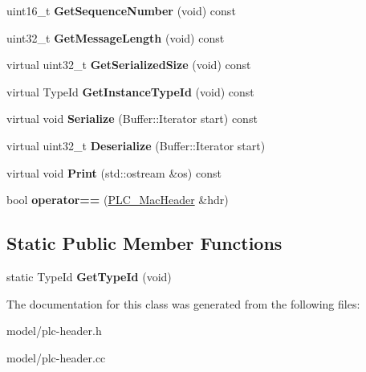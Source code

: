 \begin{DoxyCompactItemize}
\item 
\hypertarget{classns3_1_1PLC__MacHeader_af3e3e43fa22ed326bd86bb7b474b1992}{uint16\-\_\-t {\bfseries \-Get\-Sequence\-Number} (void) const }\label{classns3_1_1PLC__MacHeader_af3e3e43fa22ed326bd86bb7b474b1992}

\item 
\hypertarget{classns3_1_1PLC__MacHeader_a77818e10c83a5e070bdde25678102d3d}{uint32\-\_\-t {\bfseries \-Get\-Message\-Length} (void) const }\label{classns3_1_1PLC__MacHeader_a77818e10c83a5e070bdde25678102d3d}

\item 
\hypertarget{classns3_1_1PLC__MacHeader_a566ec93ae1dc22e40f44835d3370fc38}{virtual uint32\-\_\-t {\bfseries \-Get\-Serialized\-Size} (void) const }\label{classns3_1_1PLC__MacHeader_a566ec93ae1dc22e40f44835d3370fc38}

\item 
\hypertarget{classns3_1_1PLC__MacHeader_a25a65cd915ab002024f5053fb17a799b}{virtual \-Type\-Id {\bfseries \-Get\-Instance\-Type\-Id} (void) const }\label{classns3_1_1PLC__MacHeader_a25a65cd915ab002024f5053fb17a799b}

\item 
\hypertarget{classns3_1_1PLC__MacHeader_a913f9c4ab8055a36ba2027d514eb2b78}{virtual void {\bfseries \-Serialize} (\-Buffer\-::\-Iterator start) const }\label{classns3_1_1PLC__MacHeader_a913f9c4ab8055a36ba2027d514eb2b78}

\item 
\hypertarget{classns3_1_1PLC__MacHeader_a938c0de95ea150b68b69bdfe09e5605c}{virtual uint32\-\_\-t {\bfseries \-Deserialize} (\-Buffer\-::\-Iterator start)}\label{classns3_1_1PLC__MacHeader_a938c0de95ea150b68b69bdfe09e5605c}

\item 
\hypertarget{classns3_1_1PLC__MacHeader_a57133fa08027075f8e76aa81363f9eed}{virtual void {\bfseries \-Print} (std\-::ostream \&os) const }\label{classns3_1_1PLC__MacHeader_a57133fa08027075f8e76aa81363f9eed}

\item 
\hypertarget{classns3_1_1PLC__MacHeader_a6bad9e8f89603a05081ab9167e8e597f}{bool {\bfseries operator==} (\hyperlink{classns3_1_1PLC__MacHeader}{\-P\-L\-C\-\_\-\-Mac\-Header} \&hdr)}\label{classns3_1_1PLC__MacHeader_a6bad9e8f89603a05081ab9167e8e597f}

\end{DoxyCompactItemize}
\subsection*{\-Static \-Public \-Member \-Functions}
\begin{DoxyCompactItemize}
\item 
\hypertarget{classns3_1_1PLC__MacHeader_a037161cf8a6ff76d5fae3036a3396169}{static \-Type\-Id {\bfseries \-Get\-Type\-Id} (void)}\label{classns3_1_1PLC__MacHeader_a037161cf8a6ff76d5fae3036a3396169}

\end{DoxyCompactItemize}


\-The documentation for this class was generated from the following files\-:\begin{DoxyCompactItemize}
\item 
model/plc-\/header.\-h\item 
model/plc-\/header.\-cc\end{DoxyCompactItemize}
